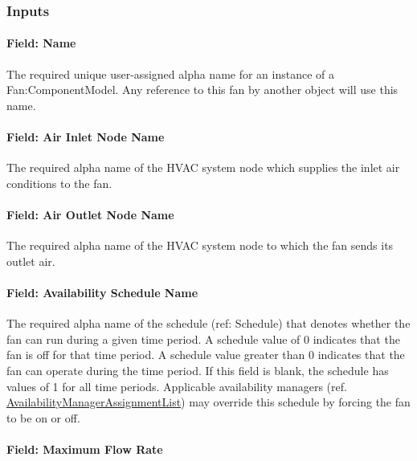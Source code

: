 \subsubsection{Inputs}\label{inputs-5-011}

\paragraph{Field: Name}\label{field-name-4-011}

The required unique user-assigned alpha name for an instance of a Fan:ComponentModel. Any reference to this fan by another object will use this name.

\paragraph{Field: Air Inlet Node Name}\label{field-air-inlet-node-name-4-000}

The required alpha name of the HVAC system node which supplies the inlet air conditions to the fan.

\paragraph{Field: Air Outlet Node Name}\label{field-air-outlet-node-name-4-000}

The required alpha name of the HVAC system node to which the fan sends its outlet air.

\paragraph{Field: Availability Schedule Name}\label{field-availability-schedule-name-4-002}

The required alpha name of the schedule (ref: Schedule) that denotes whether the fan can run during a given time period. A schedule value of 0 indicates that the fan is off for that time period. A schedule value greater than 0 indicates that the fan can operate during the time period. If this field is blank, the schedule has values of 1 for all time periods. Applicable availability managers (ref. \hyperref[availabilitymanagerassignmentlist]{AvailabilityManagerAssignmentList}) may override this schedule by forcing the fan to be on or off.

\paragraph{Field: Maximum Flow Rate}\label{field-maximum-flow-rate-5}

